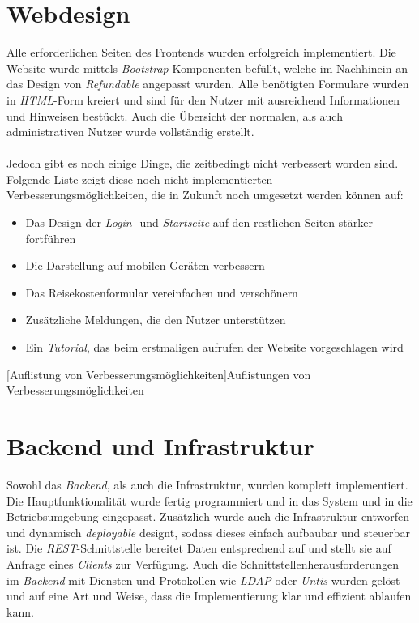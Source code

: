 \section{Webdesign}
Alle erforderlichen Seiten des Frontends wurden erfolgreich implementiert. Die Website wurde mittels \textit{Bootstrap}-Komponenten befüllt, welche im Nachhinein an das Design von \textit{Refundable} angepasst wurden. Alle benötigten Formulare wurden in \textit{HTML}-Form kreiert und sind für den Nutzer mit ausreichend Informationen und Hinweisen bestückt. Auch die Übersicht der normalen, als auch administrativen Nutzer wurde vollständig erstellt.\\
~\\
Jedoch gibt es noch einige Dinge, die zeitbedingt nicht verbessert worden sind. Folgende Liste zeigt diese noch nicht implementierten Verbesserungsmöglichkeiten, die in Zukunft noch umgesetzt werden können auf:
\begin{itemize}
	\item Das Design der \textit{Login-} und \textit{Startseite} auf den restlichen Seiten stärker fortführen
	\item Die Darstellung auf mobilen Geräten verbessern
	\item Das Reisekostenformular vereinfachen und verschönern
	\item Zusätzliche Meldungen, die den Nutzer unterstützen
	\item Ein \textit{Tutorial}, das beim erstmaligen aufrufen der Website vorgeschlagen wird
\end{itemize}
[Auflistung von Verbesserungsmöglichkeiten]{Auflistungen von Verbesserungsmöglichkeiten}

\newpage

\section{Backend und Infrastruktur}

Sowohl das \textit{Backend}, als auch die Infrastruktur, wurden komplett implementiert. Die Hauptfunktionalität wurde fertig programmiert und in das System und in die Betriebsumgebung eingepasst. Zusätzlich wurde auch die Infrastruktur entworfen und dynamisch \textit{deployable} designt, sodass dieses einfach aufbaubar und steuerbar ist. Die \textit{REST}-Schnittstelle bereitet Daten entsprechend auf und stellt sie auf Anfrage eines \textit{Clients} zur Verfügung. Auch die Schnittstellenherausforderungen im \textit{Backend} mit Diensten und Protokollen wie \textit{LDAP} oder \textit{Untis} wurden gelöst und auf eine Art und Weise, dass die Implementierung klar und effizient ablaufen kann.\\

